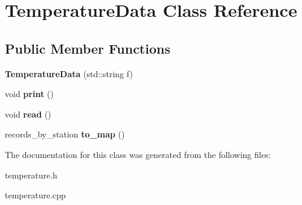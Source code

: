 \hypertarget{classTemperatureData}{}\section{Temperature\+Data Class Reference}
\label{classTemperatureData}
\subsection*{Public Member Functions}
\begin{DoxyCompactItemize}
\item 
{\bfseries Temperature\+Data} (std\+::string f)\hypertarget{classTemperatureData_a19f3995f4da969ee0f03d51ae62b1ac7}{}\label{classTemperatureData_a19f3995f4da969ee0f03d51ae62b1ac7}

\item 
void {\bfseries print} ()\hypertarget{classTemperatureData_a37c787aa773b2d4da5a61e35745a15ba}{}\label{classTemperatureData_a37c787aa773b2d4da5a61e35745a15ba}

\item 
void {\bfseries read} ()\hypertarget{classTemperatureData_ac481b4de9ca185ac241f991d954c5794}{}\label{classTemperatureData_ac481b4de9ca185ac241f991d954c5794}

\item 
records\+\_\+by\+\_\+station {\bfseries to\+\_\+map} ()\hypertarget{classTemperatureData_af86f3b796d2b55220792e4b722a07026}{}\label{classTemperatureData_af86f3b796d2b55220792e4b722a07026}

\end{DoxyCompactItemize}


The documentation for this class was generated from the following files\+:\begin{DoxyCompactItemize}
\item 
temperature.\+h\item 
temperature.\+cpp\end{DoxyCompactItemize}

